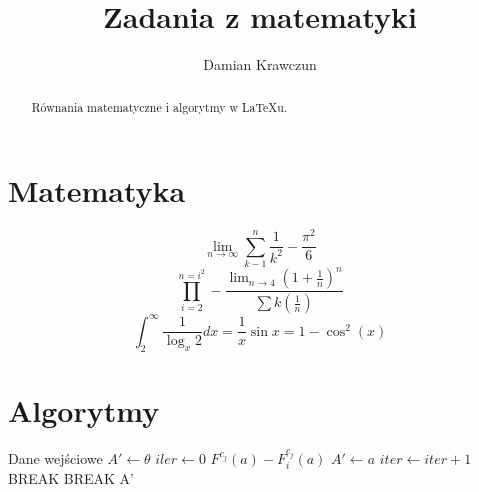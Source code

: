 \documentclass[a4paper,12pt]{article}
\title{Zadania z matematyki}
\author{Damian Krawczun}
\begin{document}
\maketitle

\begin{abstract}
Równania matematyczne i algorytmy w \LaTeX{u}.
\end{abstract}
\section{Matematyka}
%
$$
\lim\limits_{n \to \infty}
\sum\limits_{k-1}^n
\frac{1}{k^{2}}
-\frac{\pi^{2}}{6}
$$
%
$$
\prod\limits_{i=2}^{n=i^2}
-\frac{\lim\nolimits_{n \to 4}(1+\frac{1}{n})^n}{\sum{}k(\frac{1}{n})}
$$
%
$$
\int_{2}^{\infty}
\frac{1}{\log_{x}{2}}dx=
\frac{1}{x}\sin{x}=
1-\cos^{2}(x)
$$
%
$$

$$
\section{Algorytmy}

\begin{algorithmic}[1]
\STATE Dane wejściowe
\STATE$A'\leftarrow \theta$
\STATE$iler\leftarrow 0$
\STATE $F^{c_j}(a)-F_{i}^{c_j}(a)$
\STATE$A'\leftarrow a$
$iter\leftarrow iter+1$
\STATE BREAK
\ENDIF
\ENDIF
\ENDFOR
{}
\STATE BREAK
\ENDIF
\ENDFOR
\RETURN A'
\end{algorithmic}
\end{document}
